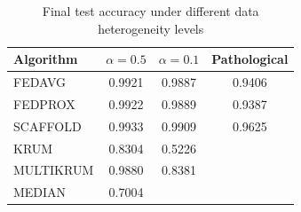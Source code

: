 \begin{table}[h]
\centering
\caption{Final test accuracy under different data heterogeneity levels}
\label{tab:non_iid_results}
\begin{tabular}{l|ccc}
\hline
Algorithm & $\alpha=0.5$ & $\alpha=0.1$ & Pathological \\
\hline
FEDAVG & 0.9921 & 0.9887 & 0.9406 \\
FEDPROX & 0.9922 & 0.9889 & 0.9387 \\
SCAFFOLD & 0.9933 & 0.9909 & 0.9625 \\
KRUM & 0.8304 & 0.5226 \\
MULTIKRUM & 0.9880 & 0.8381 \\
MEDIAN & 0.7004 \\
\hline
\end{tabular}
\end{table}